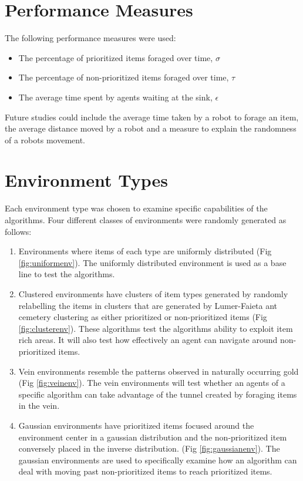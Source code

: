 \section{Performance Measures}
\label{thri:third:performancemeasures}

The following performance measures were used: 

	\begin{itemize}
		\item	The percentage of prioritized items foraged over time,  $\sigma$ 
		\item	The percentage of non-prioritized items foraged over time, $\tau$
		\item   The average time spent by agents waiting at the sink, $\epsilon$
	\end{itemize}
	
Future studies could include the average time taken by a robot to forage an item, the average distance moved by a robot and a measure to explain the randomness of a robots movement. 

\section{Environment Types}
\label{thri:third:environmenttypes}
Each environment type was chosen to examine specific capabilities of the algorithms. Four different classes of environments were randomly generated as follows:
\begin{enumerate}
\item Environments where items of each type are uniformly distributed (Fig \ref{fig:uniformenv}). The uniformly distributed environment is used as a base line to test the algorithms.
\item Clustered environments have clusters of item types generated by randomly relabelling the items in clusters that are generated by Lumer-Faieta ant cemetery clustering \cite{lumer1994diversity} as either prioritized or non-prioritized items (Fig \ref{fig:clusterenv}). These algorithms test the algorithms ability to exploit item rich areas. It will also test how effectively an agent can navigate around non-prioritized items. 
\item Vein environments resemble the patterns observed in naturally occurring gold \cite{frimmel2002recent} (Fig \ref{fig:veinenv}). The vein environments will test whether an agents of a specific algorithm can take advantage of the tunnel created by foraging items in the vein. 
\item Gaussian environments have prioritized items focused around the environment center in a gaussian distribution and the non-prioritized item conversely placed in the inverse distribution. (Fig \ref{fig:gaussianenv}). The gaussian environments are used to specifically examine how an algorithm can deal with moving past non-prioritized items to reach prioritized items. 
\end{enumerate} 

